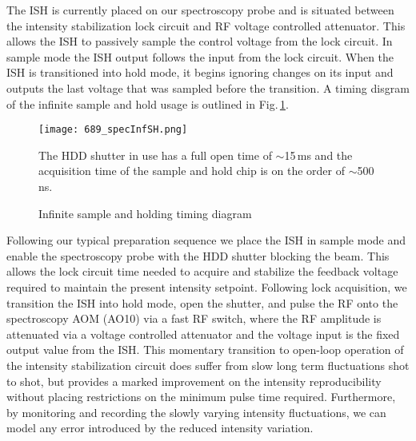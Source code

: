 The ISH is currently placed on our spectroscopy probe and is situated between the intensity stabilization lock circuit and RF voltage controlled attenuator.
This allows the ISH to passively sample the control voltage from the lock circuit.
In sample mode the ISH output follows the input from the lock circuit.
When the ISH is transitioned into hold mode, it begins ignoring changes on its input and outputs the last voltage that was sampled before the transition.
A timing disgram of the infinite sample and hold usage is outlined in Fig.\,\ref{fig:689specInfSH}.
	\begin{figure}
	\centerline{
		\texttt{[image: 689\_specInfSH.png]}}
		\caption{Infinite sample and holding timing diagram}{The HDD shutter in use has a full open time of $\sim$15\,ms and the acquisition time of the sample and hold chip is on the order of $\sim$500\,ns.}
		 \label{fig:689specInfSH}
	\end{figure}
Following our typical preparation sequence we place the ISH in sample mode and enable the spectroscopy probe with the HDD shutter blocking the beam. 
This allows the lock circuit time needed to acquire and stabilize the feedback voltage required to maintain the present intensity setpoint.
Following lock acquisition, we transition the ISH into hold mode, open the shutter, and pulse the RF onto the spectroscopy AOM (AO10) via a fast RF switch, where the RF amplitude is attenuated via a voltage controlled attenuator and the voltage input is the fixed output value from the ISH.
This momentary transition to open-loop operation of the intensity stabilization circuit does suffer from slow long term fluctuations shot to shot, but provides a marked improvement on the intensity reproducibility without placing restrictions on the minimum pulse time required.
Furthermore, by monitoring and recording the slowly varying intensity fluctuations, we can model any error introduced by the reduced intensity variation.

